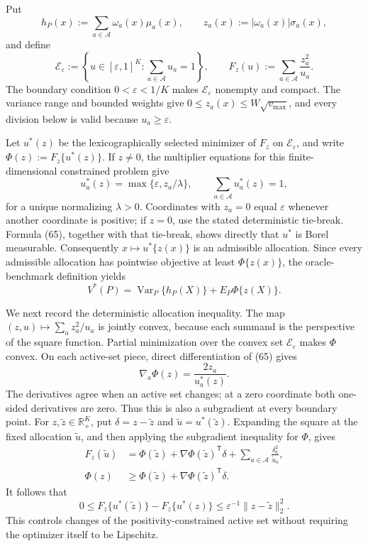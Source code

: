 Put
\[
h_P(x):=\sum_{a\in\mathcal A}\omega_a(x)\mu_a(x),
\qquad
z_a(x):=|\omega_a(x)|\sigma_a(x),
\]
and define
\[
\mathcal E_{\varepsilon}:=
\left\{u\in[\varepsilon,1]^K:\sum_{a\in\mathcal A}u_a=1\right\},
\qquad
F_z(u):=\sum_{a\in\mathcal A}\frac{z_a^2}{u_a}.
\tag{64}
\]
The boundary condition \(0<\varepsilon<1/K\) makes \(\mathcal E_{\varepsilon}\) nonempty and compact. The variance range and bounded weights give \(0\leq z_a(x)\leq W\sqrt{v_{\max}}\), and every division below is valid because \(u_a\geq\varepsilon\).

Let \(u^*(z)\) be the lexicographically selected minimizer of \(F_z\) on \(\mathcal E_{\varepsilon}\), and write \(\Phi(z):=F_z\{u^*(z)\}\). If \(z\neq0\), the multiplier equations for this finite-dimensional constrained problem give
\[
u_a^*(z)=\max\{\varepsilon,z_a/\lambda\},
\qquad
\sum_{a\in\mathcal A}u_a^*(z)=1,
\tag{65}
\]
for a unique normalizing \(\lambda>0\). Coordinates with \(z_a=0\) equal \(\varepsilon\) whenever another coordinate is positive; if \(z=0\), use the stated deterministic tie-break. Formula (65), together with that tie-break, shows directly that \(u^*\) is Borel measurable. Consequently \(x\mapsto u^*\{z(x)\}\) is an admissible allocation. Since every admissible allocation has pointwise objective at least \(\Phi\{z(x)\}\), the oracle-benchmark definition yields
\[
V^*(P)=\operatorname{Var}_P\{h_P(X)\}+E_P\Phi\{z(X)\}.
\tag{66}
\]

We next record the deterministic allocation inequality. The map \((z,u)\mapsto\sum_a z_a^2/u_a\) is jointly convex, because each summand is the perspective of the square function. Partial minimization over the convex set \(\mathcal E_{\varepsilon}\) makes \(\Phi\) convex. On each active-set piece, direct differentiation of (65) gives
\[
\nabla_a\Phi(z)=\frac{2z_a}{u_a^*(z)}.
\]
The derivatives agree when an active set changes; at a zero coordinate both one-sided derivatives are zero. Thus this is also a subgradient at every boundary point. For \(z,\widetilde z\in\mathbb R_+^K\), put \(\delta=z-\widetilde z\) and \(\widetilde u=u^*(\widetilde z)\). Expanding the square at the fixed allocation \(\widetilde u\), and then applying the subgradient inequality for \(\Phi\), gives
\[
\begin{aligned}
F_z(\widetilde u)
&=\Phi(\widetilde z)+\nabla\Phi(\widetilde z)^{\mathsf T}\delta
+\sum_{a\in\mathcal A}\frac{\delta_a^2}{\widetilde u_a},\\
\Phi(z)&\geq
\Phi(\widetilde z)+\nabla\Phi(\widetilde z)^{\mathsf T}\delta.
\end{aligned}
\]
It follows that
\[
0\leq F_z\{u^*(\widetilde z)\}-F_z\{u^*(z)\}
\leq\varepsilon^{-1}\|z-\widetilde z\|_2^2.
\tag{67}
\]
This controls changes of the positivity-constrained active set without requiring the optimizer itself to be Lipschitz.

